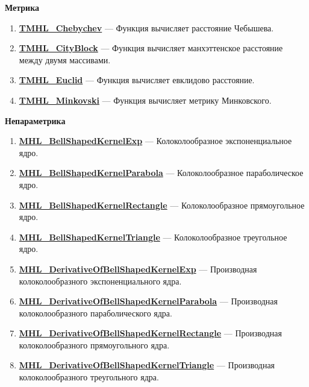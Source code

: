 \documentclass[a4paper,12pt]{article}
\begin{document}
\textbf{Метрика}
\begin{enumerate}

\item \textbf{\hyperref[TMHL_Chebychev]{TMHL\_Chebychev}} --- Функция вычисляет расстояние Чебышева.

\item \textbf{\hyperref[TMHL_CityBlock]{TMHL\_CityBlock}} --- Функция вычисляет манхэттенское расстояние между двумя массивами.

\item \textbf{\hyperref[TMHL_Euclid]{TMHL\_Euclid}} --- Функция вычисляет евклидово расстояние.

\item \textbf{\hyperref[TMHL_Minkovski]{TMHL\_Minkovski}} --- Функция вычисляет метрику Минковского.

\end{enumerate}

\textbf{Непараметрика}
\begin{enumerate}

\item \textbf{\hyperref[MHL_BellShapedKernelExp]{MHL\_BellShapedKernelExp}} --- Колоколообразное экспоненциальное ядро.

\item \textbf{\hyperref[MHL_BellShapedKernelParabola]{MHL\_BellShapedKernelParabola}} --- Колоколообразное параболическое ядро.

\item \textbf{\hyperref[MHL_BellShapedKernelRectangle]{MHL\_BellShapedKernelRectangle}} --- Колоколообразное прямоугольное ядро.

\item \textbf{\hyperref[MHL_BellShapedKernelTriangle]{MHL\_BellShapedKernelTriangle}} --- Колоколообразное треугольное ядро.

\item \textbf{\hyperref[MHL_DerivativeOfBellShapedKernelExp]{MHL\_DerivativeOfBellShapedKernelExp}} --- Производная колоколообразного экспоненциального ядра.

\item \textbf{\hyperref[MHL_DerivativeOfBellShapedKernelParabola]{MHL\_DerivativeOfBellShapedKernelParabola}} --- Производная колоколообразного параболического ядра.

\item \textbf{\hyperref[MHL_DerivativeOfBellShapedKernelRectangle]{MHL\_DerivativeOfBellShapedKernelRectangle}} --- Производная колоколообразного прямоугольного ядра.

\item \textbf{\hyperref[MHL_DerivativeOfBellShapedKernelTriangle]{MHL\_DerivativeOfBellShapedKernelTriangle}} --- Производная колоколообразного треугольного ядра.

\end{enumerate}
\end{document}
